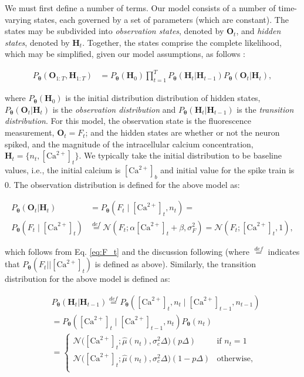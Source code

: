 \documentclass[10pt]{article}
\providecommand{\ve}[1]{\boldsymbol{#1}}
\providecommand{\ve}[1]{\boldsymbol{#1}}
\newcommand{\thetn}{\ve{\theta}}
\newcommand{\p}{P_{\thetn}}
\newcommand{\Ca}{[\text{Ca}^{2+}]}
\begin{document}
We must first define a number of terms. Our model consists of a number of time-varying states, each governed by a set of parameters (which are constant). The states may be subdivided into \emph{observation states}, denoted by $\ve{O}_t$, and \emph{hidden states}, denoted by $\ve{H}_t$. Together, the states comprise the complete likelihood, which may be simplified, given our model assumptions, as follows \cite{Rabiner89}:

\begin{align} \label{eq:complete}
\p (\ve{O}_{1:T}, \ve{H}_{1:T}) &= \p(\ve{H}_0) \prod_{t=1}^T \p(\ve{H}_t | \ve{H}_{t-1}) \p(\ve{O}_t | \ve{H}_t),
\end{align}

\noindent where $\p(\ve{H}_0)$ is the initial distribution distribution of hidden states, $\p(\ve{O}_t | \ve{H}_t)$ is the \emph{observation distribution} and $\p(\ve{H}_t | \ve{H}_{t-1})$ is the \emph{transition distribution}. For this model, the observation state is the fluorescence measurement, $\ve{O}_t=F_t$; and the hidden states are whether or not the neuron spiked, and the magnitude of the intracellular calcium concentration, $\ve{H}_t=\{n_t,\Ca_t\}$.  We typically take the initial distribution to be baseline values, i.e., the initial calcium is $\Ca_b$ and initial value for the spike train is $0$. The observation distribution is defined for the above model as: %

\begin{align} \label{eq:obs_dist}
\p(\ve{O}_t | \ve{H}_t)  &=  \p(F_t \mid  \Ca_t,n_t) =  \nonumber \\
\p(F_t \mid  \Ca_t)
	&\overset{def}{=} \mathcal{N}(F_t; \alpha \Ca_t + \beta ,\sigma_F^2) = \mathcal{N}(F_t; \Ca_t, 1),
\end{align} 

\noindent which follows from Eq. \ref{eq:F_t} and the discussion following (where $\overset{def}{=}$ indicates that $\p(F_t | \mid \Ca_t)$ is defined as above). Similarly, the transition distribution for the above model is defined as: %

\begin{align} \label{eq:trans_dist}
&\p(\ve{H}_t | \ve{H}_{t-1}) \overset{def}{=}  \p(\Ca_t,n_t \mid \Ca_{t-1},n_{t-1}) \nonumber \\
&= \p(\Ca_t \mid \Ca_{t-1}, n_t) \p(n_t) \nonumber \\
&= 
\begin{cases}
\mathcal{N}\big(\Ca_t; \widehat{\mu}(n_t), \sigma_c^2 \Delta\big) (p \Delta)& \text{if } n_t=1 \\
\mathcal{N}\big(\Ca_t; \widehat{\mu}(n_t), \sigma_c^2 \Delta\big) (1-p \Delta)& \text{otherwise,}\\
\end{cases}
\end{align}
\end{document}
